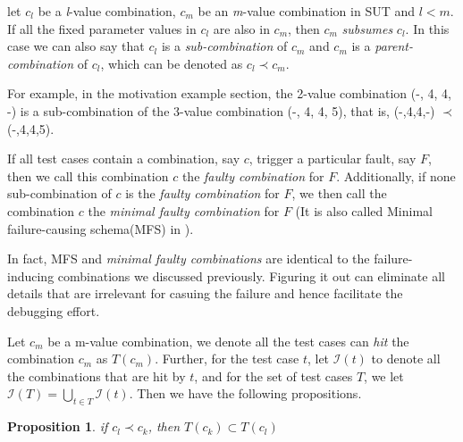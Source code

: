 \documentclass{sig-alternate}
\begin{document}
\begin{definition}
let $c_{l}$ be a \emph{l}-value combination, $c_{m}$ be an \emph{m}-value combination in SUT and $l < m$. If all the fixed parameter values in $c_{l}$ are also in $c_{m}$, then $c_{m}$ \emph{subsumes} $c_{l}$. In this case we can also say that $c_{l}$ is a \emph{sub-combination} of $c_{m}$ and $c_{m}$ is a \emph{parent-combination} of $c_{l}$, which can be denoted as $c_{l} \prec  c_{m}$.
\end{definition}

For example, in the motivation example section, the 2-value combination (-, 4, 4, -) is a sub-combination of the 3-value combination (-, 4, 4, 5), that is, (-,4,4,-) $\prec$ (-,4,4,5).

\begin{definition}
If all test cases contain a combination, say $c$, trigger a particular fault, say $F$, then we call this combination $c$ the \emph{faulty combination} for $F$. Additionally, if none sub-combination of $c$ is the \emph{faulty combination} for $F$, we then call the combination $c$ the \emph{minimal faulty combination} for $F$ (It is also called Minimal failure-causing schema(MFS) in \cite{nie2011minimal}).

\end{definition}

In fact, MFS and \emph{minimal faulty combinations} are identical to the failure-inducing combinations we discussed previously. Figuring it out can eliminate all details that are irrelevant for casuing the failure and hence facilitate the debugging effort.

%

Let $c_{m}$ be a m-value combination, we denote all the test cases can \emph{hit} the combination $c_{m}$ as $T(c_{m})$. Further, for the test case $t$, let $\mathcal{I}(t)$ to denote all the combinations that are hit by $t$, and for the set of test cases $T$, we let $\mathcal{I}(T) = \bigcup_{t\in T} \mathcal{I}(t)$. Then we have the following propositions.


\newtheorem{proposition}{Proposition}
\begin{proposition}
if $c_{l} \prec c_{k}$, then $T(c_{k}) \subset T(c_{l})$
\end{proposition}
\end{document}
